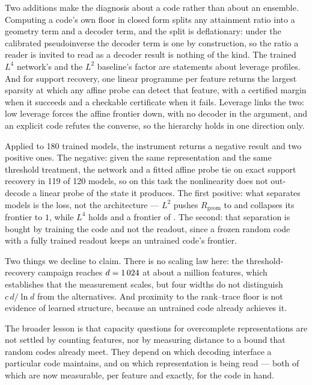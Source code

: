 \documentclass[preprint,12pt]{elsarticle}
\theoremstyle{definition}
\begin{document}
Two additions make the diagnosis about a code rather than about an ensemble. Computing a code's
own floor in closed form splits any attainment ratio into a geometry term and a decoder term, and
the split is deflationary: under the calibrated pseudoinverse the decoder term is one by
construction, so the ratio a reader is invited to read as a decoder result is nothing of the
kind. The trained $L^4$ network's \EfiveLfourRatioPinvMean{} and the $L^2$ baseline's factor
\EfiveLtwoRatioLsMean{} are statements about leverage profiles. And for support recovery, one
linear programme per feature returns the largest sparsity at which any affine probe can detect
that feature, with a certified margin when it succeeds and a checkable certificate when it fails.
Leverage links the two: low leverage forces the affine frontier down, with no decoder in the
argument, and an explicit code refutes the converse, so the hierarchy holds in one direction
only.

Applied to 180 trained models, the instrument returns a negative result and two positive ones. The
negative: given the same representation and the same threshold treatment, the network and a fitted
affine probe tie on exact support recovery in 119 of 120 models, so on this task the nonlinearity
does not out-decode a linear probe of the state it produces. The first positive: what separates
models is the loss, not the architecture --- $L^2$ pushes $R_{\mathrm{geom}}$ to
\SALtwoTwoHundredRgeom{} and collapses its frontier to $1$, while $L^4$ holds
\SALfourTwoHundredRgeom{} and a frontier of \FullLfourTwoHundredKappaMin{}. The second: that
separation is bought by training the code and not the readout, since a frozen random code with a
fully trained readout keeps an untrained code's frontier.

Two things we decline to claim. There is no scaling law here: the threshold-recovery campaign reaches
$d=1\,024$ at about a million features, which establishes that the measurement scales, but four
widths do not distinguish $c\,d/\ln d$ from the alternatives. And proximity to the rank--trace floor
is not evidence of learned structure, because an untrained code already achieves it.

The broader lesson is that capacity questions for overcomplete representations are not settled by
counting features, nor by measuring distance to a bound that random codes already meet. They depend
on which decoding interface a particular code maintains, and on which representation is being read ---
both of which are now measurable, per feature and exactly, for the code in hand.
\end{document}
